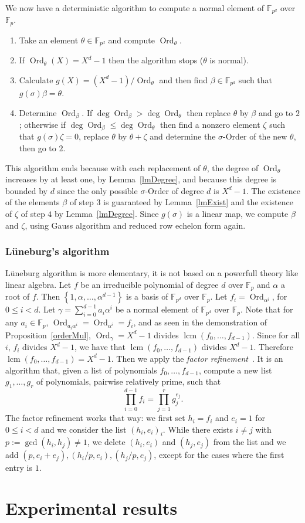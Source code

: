 \documentclass[a4paper,11pt]{article}
\theoremstyle{break}
\theoremstyle{sc}
\theoremstyle{definition}
\theoremstyle{remark}
\DeclareMathOperator{\Ord}{Ord}
\DeclareMathOperator{\lcm}{lcm}
\begin{document}
We now have a deterministic algorithm to compute a normal element of
$\mathbb{F}_{p^d}$ over $\mathbb{F}_p$.
\begin{enumerate}
  \item Take an element $\theta\in\mathbb{F}_{p^d}$ and compute
    $\Ord_\theta$.
  \item If $\Ord_\theta(X)=X^d-1$ then the algorithm stops ($\theta$ is
    normal).
  \item Calculate $g(X)=(X^d-1)/\Ord_\theta$ and then find
    $\beta\in\mathbb{F}_{p^d}$ such that $g(\sigma)\beta=\theta$.
  \item Determine $\Ord_\beta$. If $\deg\Ord_\beta>\deg\Ord_\theta$ then
    replace $\theta$ by $\beta$ and go to $2$; otherwise if
    $\deg\Ord_\beta\leq\deg\Ord_\theta$ then find a nonzero element $\zeta$
    such that $g(\sigma)\zeta=0$, replace $\theta$ by $\theta+\zeta$ and
    determine the $\sigma$-Order of the new $\theta$, then go to $2$.
\end{enumerate}
This algorithm ends because with each replacement of $\theta$, the degree of
$\Ord_\theta$ increases by at least one, by Lemma~\ref{lmDegree}, and because
this degree is bounded by $d$ since the only possible $\sigma$-Order of degree
$d$ is $X^d-1$. The existence of the elements $\beta$ of step $3$ is guaranteed
by Lemma~\ref{lmExist} and the existence of $\zeta$ of step $4$ by
Lemma~\ref{lmDegree}. Since $g(\sigma)$ is a linear map, we compute $\beta$ and
$\zeta$, using Gauss algorithm and reduced row echelon form again.

\subsubsection{Lüneburg's algorithm}
Lüneburg algorithm is more elementary, it is not based on a powerfull theory
like linear algebra. Let $f$ be an irreducible polynomial of degree $d$ over
$\mathbb{F}_p$ and $\alpha$ a root of $f$. Then $\left\{ 1, \alpha, \dots,
  \alpha^{d-1}
\right\}$ is a basis of $\mathbb{F}_{p^d}$ over $\mathbb{F}_p$. Let
$f_i=\Ord_{\alpha^i}$, for $0\leq i < d$. Let
$\gamma=\sum_{i=0}^{d-1}a_i\alpha^i$ be a normal element of
$\mathbb{F}_{p^d}$ over $\mathbb{F}_p$. Note that for any
$a_i\in\mathbb{F}_p$, $\Ord_{a_i\alpha^i}=\Ord_{\alpha^i}=f_i$, and as seen in the
demonstration of Proposition~\ref{orderMul}, $\Ord_\gamma=X^d-1$ divides
$\lcm(f_0, \dots, f_{d-1})$. Since for all $i$, $f_i$ divides $X^d-1$, we have that
$\lcm(f_0, \dots, f_{d-1})$ divides $X^d-1$. Therefore $\lcm(f_0, \dots,
f_{d-1})=X^d-1$. Then we apply the \emph{factor
refinement}~\cite{BaDrSh93}. It is an algorithm that, given a list of
polynomials $f_0, \dots, f_{d-1}$, compute a new list $g_1, \dots, g_r$ of
polynomials, pairwise relatively prime, such that
\[ \prod_{i=0}^{d-1} f_i=\prod_{j=1}^{r} g_j^{e_j}. \]
The factor refinement works that way: we first set $h_i=f_i$ and $e_i=1$ for $0\leq i
<d$ and we consider the list $(h_i, e_i)_{i}$. While there exists $i\neq j$ with $p:=\gcd(h_i, h_j)\neq1$, we delete
$(h_i,e_i)$ and $(h_j,e_j)$ from the list and we add $(p, e_i+e_j),( h_i/p,
e_i), (h_j/p, e_j)$, except for the cases where the first entry is $1$.

\section{Experimental results}

\clearpage


\end{document}
